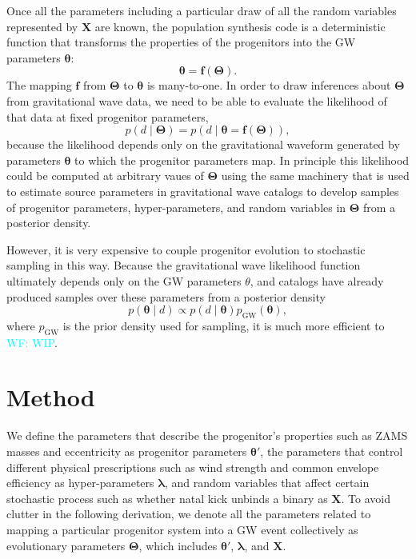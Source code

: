 \documentclass[twocolumn]{aastex631}
\newcommand{\wf}[1]{\textcolor{cyan}{WF: #1}}
\begin{document}
Once all the parameters including a particular draw of all the random variables
represented by $\bm{X}$ are known, the population synthesis code is a
deterministic function that transforms the properties of the progenitors into
the GW parameters $\bm{\theta}$:
\begin{equation}
    \bm{\theta} = \bm{f}\left( \bm{\Theta} \right).
\end{equation}
The mapping $\bm{f}$ from $\bm{\Theta}$ to $\bm{\theta}$ is many-to-one.  
In order to draw inferences about $\bm{\Theta}$ from gravitational wave data, we
need to be able to evaluate the likelihood of that data at fixed progenitor
parameters, 
\begin{equation}
    p\left( d \mid \bm{\Theta} \right) = p\left( d \mid \bm{\theta} = \bm{f}\left( \bm{\Theta} \right) \right),
\end{equation}
because the likelihood depends only on the gravitational waveform generated by
parameters $\bm{\theta}$ to which the progenitor parameters map.  In principle
this likelihood could be computed at arbitrary vaues of $\bm{\Theta}$ using the
same machinery that is used to estimate source parameters in gravitational wave
catalogs \citep{Veitch2015,Ashton2019,Romero-Shaw2020,GWTC-3} to develop samples
of progenitor parameters, hyper-parameters, and random variables in
$\bm{\Theta}$ from a posterior density.

However, it is very expensive to couple progenitor evolution to stochastic
sampling in this way.  Because the gravitational wave likelihood function
ultimately depends only on the GW parameters $\theta$, and catalogs have already
produced samples over these parameters from a posterior density 
\begin{equation}
    p\left( \bm{\theta} \mid d \right) \propto p\left( d \mid \bm{\theta} \right) p_\mathrm{GW} \left( \bm{\theta} \right),
\end{equation}
where $p_\mathrm{GW}$ is the prior density used for sampling, it is much more
efficient to \wf{WIP}.

\section{Method}
\label{sec:method}

We define the parameters that describe the progenitor's properties such as ZAMS masses and eccentricity as progenitor parameters $\bm{\theta'}$,
the parameters that control different physical prescriptions such as wind strength and common envelope efficiency as hyper-parameters $\bm{\lambda}$,
and random variables that affect certain stochastic process such as whether natal kick unbinds a binary as $\bm{X}$.
To avoid clutter in the following derivation,
we denote all the parameters related to mapping a particular progenitor system into a GW event collectively as evolutionary parameters $\bm{\Theta}$,
which includes $\bm{\theta'}$, $\bm{\lambda}$, and $\bm{X}$.
\end{document}
